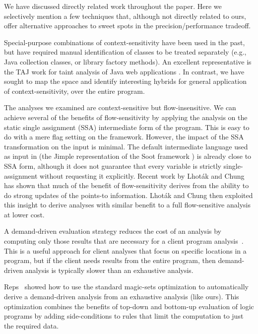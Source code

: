 We have discussed directly related work throughout the paper. Here we
selectively mention a few techniques that, although not directly
related to ours, offer alternative approaches to sweet spots in the
precision/performance tradeoff.

Special-purpose combinations of context-sensitivity have been used in
the past, but have required manual identification of classes to be
treated separately (e.g., Java collection classes, or library factory
methods). An excellent representative is the TAJ work for taint
analysis of Java web applications
\cite{pldi:2009:Tripp}. In contrast, we have sought to
map the space and identify interesting hybrids for general application
of context-sensitivity, over the entire program.

The analyses we examined are context-sensitive but flow-insensitive.
We can achieve several of the benefits of flow-sensitivity by applying
the analysis on the static single assignment (SSA) intermediate form
of the program. This is easy to do with a mere flag setting on the
\doop{} framework. However, the impact of the SSA transformation
on the input is minimal. The default intermediate language used as
input in \doop{} (the Jimple representation of the Soot
framework \cite{cascon:1999:Vall,cc:2000:Vall}) is already close to
SSA form, although it does not guarantee that every variable is
strictly single-assignment without requesting it explicitly.  Recent
work by Lhot\'{a}k and Chung \cite{popl:2011:Lhotak} has shown that
much of the benefit of flow-sensitivity derives from the ability to do
strong updates of the points-to information. Lhot\'{a}k and Chung then
exploited this insight to derive analyses with similar benefit to a
full flow-sensitive analysis at lower cost.

A demand-driven evaluation strategy reduces the cost of an analysis by
computing only those results that are necessary for a client program
analysis~\cite{oopsla:2005:Sridharan,pldi:2006:Sridharan,popl:2008:Zheng,pldi:2001:Heintze}. This is a useful
approach for client analyses that focus on specific locations in a
program, but if the client needs results from the entire program, then
demand-driven analysis is typically slower than an exhaustive
analysis.

Reps~\cite{cc:1994:Reps} showed how to use the standard magic-sets
optimization to automatically derive a demand-driven analysis
from an exhaustive analysis (like ours). This optimization
combines the benefits of top-down and bottom-up evaluation of
logic programs by adding side-conditions to rules that limit
the computation to just the required data.

